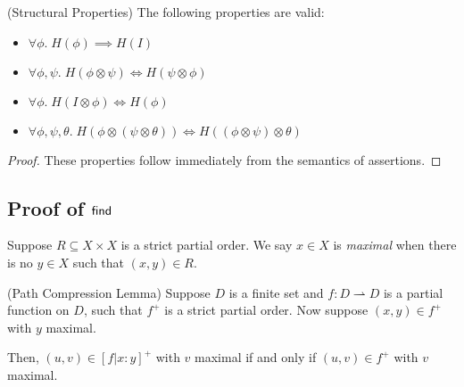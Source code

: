 \begin{lemma}{(Structural Properties)}
The following properties are valid:
\begin{itemize}
\item $\forall \phi.\;H(\phi) \implies H(I)$
\item $\forall \phi,\psi.\;H(\phi \otimes \psi) \iff H(\psi \otimes \phi)$
\item $\forall \phi.\;H(I \otimes \phi) \iff H(\phi)$
\item $\forall \phi,\psi,\theta.\;H(\phi \otimes (\psi \otimes \theta)) \iff H((\phi \otimes \psi) \otimes \theta)$
\end{itemize}
\end{lemma}
\begin{proof}
These properties follow immediately from the semantics of assertions. 
\end{proof}

\subsection{Proof of $\mathsf{find}$}

Suppose $R \subseteq X \times X$ is a strict partial order. We say $x \in X$ is \emph{maximal}
when there is no $y \in X$ such that $(x,y) \in R$. 

\begin{lemma}{(Path Compression Lemma)}
  Suppose $D$ is a finite set and $f : D \rightharpoonup D$ is a partial function on $D$,
such that $f^{+}$ is a strict partial order. Now suppose $(x,y) \in f^{+}$ with $y$ maximal.

Then, $(u,v) \in [f|x:y]^{+}$ with $v$ maximal if and only if $(u,v) \in f^{+}$ with $v$ maximal. 
\end{lemma}

